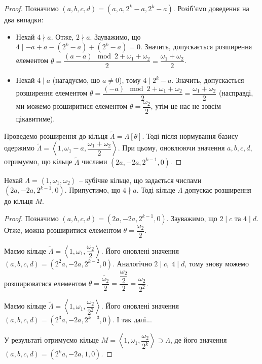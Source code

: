 \documentclass{thesis}
\begin{document}
\begin{proof}
Позначимо $(a,b,c,d) = (a,a,2^k-a,2^k-a)$. Розіб'ємо доведення на два випадки:
\begin{itemize}
\item Нехай $4 \nmid a$. Отже, $2 \nmid a$. Зауважимо, що $4 \mid -a + a - (2^k-a) + (2^k-a) = 0$. Значить, допускається розширення елементом $\theta = \dfrac{(a-a) \mod 2 + \omega_1 + \omega_2}{2} = \dfrac{\omega_1+\omega_2}{2}$. 
\item Нехай $4 \mid a$ (нагадуємо, що $a \neq 0$), тому $4 \mid 2^k-a$. Значить, допускається розширення елементом $\theta = \dfrac{(-a) \mod 2 + \omega_1 + \omega_2}{2} = \dfrac{\omega_1 + \omega_2}{2}$ (насправді, ми можемо розширитися елементом $\theta =\dfrac{\omega_2}{2}$, утім це нас не зовсім цікавитиме).
\end{itemize}
Проведемо розширення до кільця $\tilde{\Lambda} = \Lambda[\theta]$. Тоді після нормування базису одержимо $\tilde{\Lambda} = \left< 1,\omega_1-a, \dfrac{\omega_1+\omega_2}{2}\right>$. При цьому, оновлюючи значення $a,b,c,d$, отримуємо, що кільце $\tilde{\Lambda}$ числами $(2a,-2a,2^{k-1},0)$.
\end{proof}

\begin{lemma}
Нехай $\Lambda = \left<1,\omega_1,\omega_2\right>$ -- кубічне кільце, що задається числами $(2a,-2a,2^{k-1},0)$. Припустимо, що $4 \nmid a$. Тоді кільце $\Lambda$ допускає розширення до кільця $M$.
\end{lemma}

\begin{proof}
Позначимо $(a,b,c,d) = (2a,-2a,2^{k-1},0)$. Зауважимо, що $2 \mid c$ та $4 \mid d$. Отже, можна розширитися елементом $\theta = \dfrac{\omega_2}{2}$.

Маємо кільце $\tilde{\Lambda} = \left<1,\omega_1, \dfrac{\omega_2}{2}\right>$. Його оновлені значення $(a,b,c,d) = (2^2a,-2a,2^{k-2},0)$. Аналогічно $2 \mid c,\ 4 \mid d$, тому знову можемо розширюватися елементом $\theta = \dfrac{\tilde{\omega_2}}{2} = \dfrac{\dfrac{\omega_2}{2}}{2} = \dfrac{\omega_2}{2^2}$.

Маємо кільце $\tilde{\Lambda} = \left<1, \omega_1, \dfrac{\omega_2}{2^2}\right>$. Його оновлені значення $(a,b,c,d) = (2^3a,-2a,2^{k-3},0)$. І так далі...

У результаті отримуємо кільце $M = \left< 1, \omega_1, \dfrac{\omega_2}{2^k} \right> \supset \Lambda$, де його значення $(a,b,c,d) = (2^k a, -2a, 1,0)$.
\end{proof}
\end{document}
